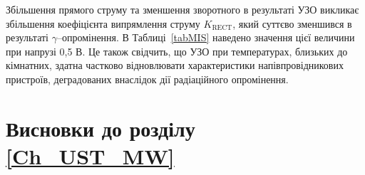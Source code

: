 Збільшення прямого струму та зменшення зворотного в результаті УЗО викликає збільшення коефіцієнта випрямлення струму
$K_\mathrm{RECT}$, який суттєво зменшився в результаті $\gamma$--опромінення.
В Таблиці~\ref{tabMIS} наведено значення цієї величини при напрузі 0,5 В.
Це також свідчить, що УЗО при температурах, близьких до кімнатних, здатна частково відновлювати характеристики напівпровідникових пристроїв, деградованих внаслідок дії радіаційного опромінення.







\section*{Висновки до розділу \ref{Ch_UST_MW}}
